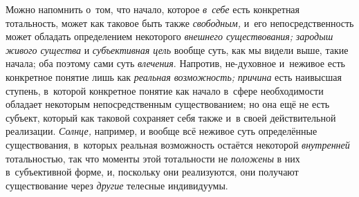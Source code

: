 Можно напомнить о~том, что начало, которое {\em в~себе} есть
конкретная тотальность, может как таковое быть также {\em свободным,} и~его
непосредственность может обладать определением некоторого
{\em внешнего существования;}
{\em зародыш живого существа} и {\em субъективная цель}
вообще суть, как мы видели выше, такие начала; оба поэтому
сами суть {\em влечения}.
Напротив, не-духовное и~неживое есть конкретное понятие лишь
как {\em реальная возможность;} {\em причина} есть
наивысшая ступень, в~которой конкретное понятие как начало в~сфере
необходимости обладает некоторым непосредственным существованием; но она
ещё не есть субъект, который как таковой сохраняет себя также и~в своей
действительной реализации. {\em Солнце,} например, и
вообще всё неживое суть определённые существования, в~которых реальная
возможность остаётся некоторой {\em внутренней}
тотальностью, так что моменты этой тотальности не
{\em положены}
в них в~субъективной форме, и, поскольку они реализуются, они
получают существование через {\em другие} телесные индивидуумы.

